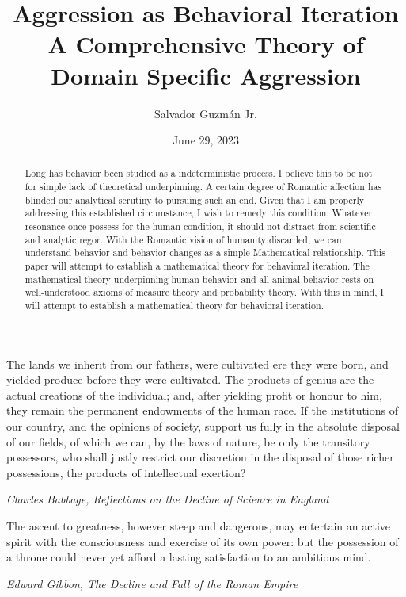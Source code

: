 \documentclass[12pt]{article}
\title{
Aggression as Behavioral Iteration \\
\large A Comprehensive Theory of Domain Specific Aggression }
\author{Salvador Guzm\'an Jr.}
\date{June 29, 2023}
\begin{document}
\maketitle
\pagebreak

\begin{abstract}
    Long has behavior been studied as a indeterministic process.
    I believe this to be not for simple lack of theoretical underpinning.
    A certain degree of Romantic affection has blinded our analytical scrutiny to pursuing such an end.
    Given that I am properly addressing this established circumstance, I wish to remedy this condition.
    Whatever resonance once possess for the human condition, it should not distract from scientific and analytic regor.
    With the Romantic vision of humanity discarded, we can understand behavior and behavior changes as a simple Mathematical relationship.
    This paper will attempt to establish a mathematical theory for behavioral iteration.
    The mathematical theory underpinning human behavior and all animal behavior rests on well-understood axioms of measure theory and probability theory.
    With this in mind, I will attempt to establish a mathematical theory for behavioral iteration.
\end{abstract}

\pagebreak

\begin{center}
    \epigraph{
        The lands we inherit from our fathers, were cultivated ere they were born, and yielded produce before they were cultivated. The products of genius are the actual creations of the individual; and, after yielding profit or honour to him, they remain the permanent endowments of the human race. If the institutions of our country, and the opinions of society, support us fully in the absolute disposal of our fields, of which we can, by the laws of nature, be only the transitory possessors, who shall justly restrict our discretion in the disposal of those richer possessions, the products of intellectual exertion?
    }{\textit{Charles Babbage, Reflections on the Decline of Science in England}}
    \epigraph{
        The ascent to greatness, however steep and dangerous, may entertain an active spirit with the consciousness and exercise of its own power: but the possession of a throne could never yet afford a lasting satisfaction to an ambitious mind.
    }{\textit{Edward Gibbon, The Decline and Fall of the Roman Empire}}
\end{center}

\pagebreak
\end{document}
